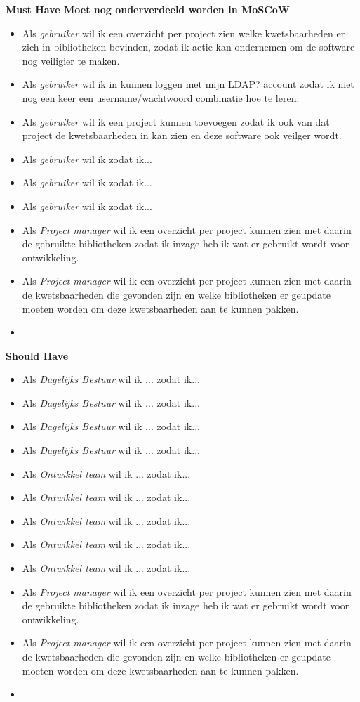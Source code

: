 \textbf{Must Have Moet nog onderverdeeld worden in MoSCoW}
\begin{itemize}
  \item Als \textit{gebruiker} wil ik een overzicht per project zien welke kwetsbaarheden er zich in bibliotheken bevinden, zodat ik actie kan ondernemen om de software nog veiligier te maken.
  \item Als \textit{gebruiker} wil ik in kunnen loggen met mijn LDAP? account zodat ik niet nog een keer een username/wachtwoord combinatie hoe te leren.
  \item Als \textit{gebruiker} wil ik een project kunnen toevoegen zodat ik ook van dat project de kwetsbaarheden in kan zien en deze software ook veilger wordt.
  \item Als \textit{gebruiker} wil ik  zodat ik...
  \item Als \textit{gebruiker} wil ik  zodat ik...
  \item Als \textit{gebruiker} wil ik  zodat ik...
  
  \item Als \textit{Project manager} wil ik een overzicht per project kunnen zien met daarin de gebruikte bibliotheken zodat ik inzage heb ik wat er gebruikt wordt voor ontwikkeling.
  \item Als \textit{Project manager} wil ik een overzicht per project kunnen zien met daarin de kwetsbaarheden die gevonden zijn en welke bibliotheken er geupdate moeten worden om deze kwetsbaarheden aan te kunnen pakken.\item
\end{itemize}

\textbf{Should Have}
\begin{itemize}
  \item Als \textit{Dagelijks Bestuur} wil ik  ... zodat ik...
  \item Als \textit{Dagelijks Bestuur} wil ik  ... zodat ik...
  \item Als \textit{Dagelijks Bestuur} wil ik  ... zodat ik...
  \item Als \textit{Dagelijks Bestuur} wil ik  ... zodat ik...
  \item Als \textit{Ontwikkel team } wil ik  ... zodat ik...
  \item Als \textit{Ontwikkel team } wil ik  ... zodat ik...
  \item Als \textit{Ontwikkel team } wil ik  ... zodat ik...
  \item Als \textit{Ontwikkel team } wil ik  ... zodat ik...
  \item Als \textit{Ontwikkel team } wil ik  ... zodat ik...
  \item Als \textit{Project manager} wil ik een overzicht per project kunnen zien met daarin de gebruikte bibliotheken zodat ik inzage heb ik wat er gebruikt wordt voor ontwikkeling.
  \item Als \textit{Project manager} wil ik een overzicht per project kunnen zien met daarin de kwetsbaarheden die gevonden zijn en welke bibliotheken er geupdate moeten worden om deze kwetsbaarheden aan te kunnen pakken.\item
\end{itemize}

